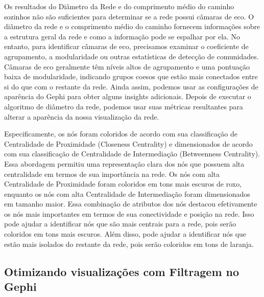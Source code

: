 Os resultados do Diâmetro da Rede e do comprimento médio do caminho sozinhos não são suficientes para determinar se a rede possui câmaras de eco. O diâmetro da rede e o comprimento médio do caminho fornecem informações sobre a estrutura geral da rede e como a informação pode se espalhar por ela. No entanto, para identificar câmaras de eco, precisamos examinar o coeficiente de agrupamento, a modularidade ou outras estatísticas de detecção de comunidades. Câmaras de eco geralmente têm níveis altos de agrupamento e uma pontuação baixa de modularidade, indicando grupos coesos que estão mais conectados entre si do que com o restante da rede. Ainda assim, podemos usar as configurações de aparência do Gephi para obter alguns insights adicionais. Depois de executar o algoritmo de diâmetro da rede, podemos usar suas métricas resultantes para alterar a aparência da nossa visualização da rede.

Especificamente, os nós foram coloridos de acordo com sua classificação de Centralidade de Proximidade (Closeness Centrality) e dimensionados de acordo com sua classificação de Centralidade de Intermediação (Betweenness Centrality). Essa abordagem permitiu uma representação clara dos nós que possuem alta centralidade em termos de sua importância na rede. Os nós com alta Centralidade de Proximidade foram coloridos em tons mais escuros de roxo, enquanto os nós com alta Centralidade de Intermediação foram dimensionados em tamanho maior. Essa combinação de atributos dos nós destacou efetivamente os nós mais importantes em termos de sua conectividade e posição na rede. Isso pode ajudar a identificar nós que são mais centrais para a rede, pois serão coloridos em tons mais escuros. Além disso, pode ajudar a identificar nós que estão mais isolados do restante da rede, pois serão coloridos em tons de laranja.

\subsection*{Otimizando visualizações com Filtragem no Gephi}

